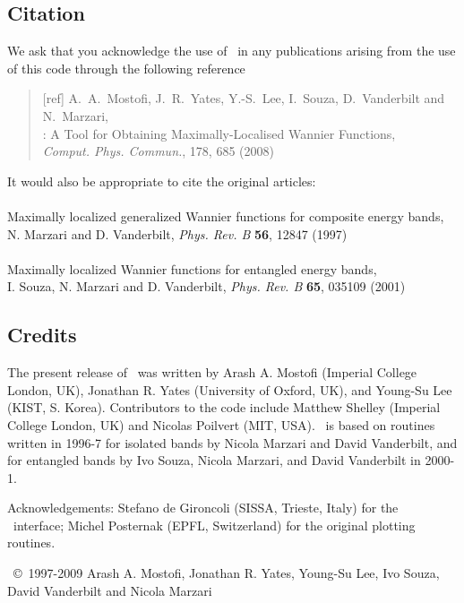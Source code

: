 \subsection{Citation}
We ask that you acknowledge the use of \wannier\ in any publications
arising from the use of this code through the following reference
\begin{quote}
[ref] A.~A.~Mostofi, J.~R.~Yates, Y.-S.~Lee, I.~Souza, D.~Vanderbilt
and N.~Marzari,\\
\wannier: A Tool for Obtaining Maximally-Localised Wannier
  Functions,\\ {\it Comput. Phys. Commun.}, 178, 685 (2008)

\end{quote}                                                              

It would also be appropriate to cite the original articles:\\\\
Maximally localized generalized Wannier functions for composite
  energy bands,\\ 
N. Marzari and D. Vanderbilt, {\it Phys. Rev. B} {\bf 56}, 12847 (1997)\\\\
Maximally localized Wannier functions for entangled energy bands,\\
I. Souza, N. Marzari and D. Vanderbilt, {\it Phys. Rev. B} {\bf 65}, 035109 (2001)


\subsection{Credits}
The present release of \wannier\ was written by Arash A. Mostofi
(Imperial College London, UK), Jonathan R. Yates (University of
Oxford, UK), and Young-Su Lee (KIST, S. Korea). Contributors to the code include
Matthew Shelley (Imperial College London, UK)
and Nicolas Poilvert (MIT, USA). \wannier\ is
based on routines written in 1996-7 for isolated bands by Nicola Marzari
and David Vanderbilt, and for entangled bands by Ivo Souza, Nicola Marzari,
and David Vanderbilt in 2000-1.

Acknowledgements: Stefano de Gironcoli (SISSA, Trieste, Italy) for the
\pwscf\ interface; Michel Posternak (EPFL, Switzerland) for the
original plotting routines. 

\wannier\ \copyright\ 1997-2009 Arash A. Mostofi, Jonathan R. Yates,
Young-Su Lee, Ivo Souza, David Vanderbilt and Nicola Marzari

